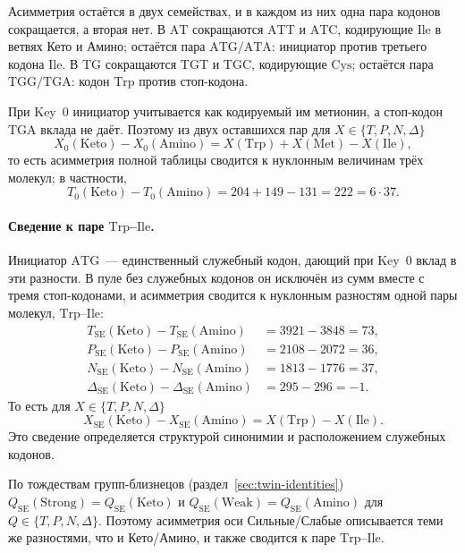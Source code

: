 \documentclass[11pt,a4paper]{article}
\renewcommand{\_}{\origunderscore\allowbreak}
\begin{document}
Асимметрия остаётся в двух семействах, и в каждом из них одна пара
кодонов сокращается, а вторая нет. В $\mathrm{AT}$ сокращаются
$\mathrm{ATT}$ и $\mathrm{ATC}$,
кодирующие $\mathrm{Ile}$ в ветвях Кето и Амино; остаётся пара
$\mathrm{ATG}/\mathrm{ATA}$: инициатор против третьего кодона
$\mathrm{Ile}$. В $\mathrm{TG}$ сокращаются $\mathrm{TGT}$ и
$\mathrm{TGC}$, кодирующие $\mathrm{Cys}$; остаётся пара
$\mathrm{TGG}/\mathrm{TGA}$: кодон $\mathrm{Trp}$ против
стоп-кодона.

При Key~0 инициатор учитывается как кодируемый им метионин, а
стоп-кодон $\mathrm{TGA}$ вклада не даёт. Поэтому из двух оставшихся
пар для $X\in\{T,P,N,\Delta\}$
\[
X_{0}(\mathrm{Keto})-X_{0}(\mathrm{Amino})
=
X(\mathrm{Trp})+X(\mathrm{Met})-X(\mathrm{Ile}),
\]
то есть асимметрия полной таблицы сводится к нуклонным величинам трёх
молекул; в частности,
\[
T_{0}(\mathrm{Keto}) - T_{0}(\mathrm{Amino})
  = 204 + 149 - 131 = 222 = 6 \cdot 37.
\]

\paragraph{Сведение к паре $\mathrm{Trp}$--$\mathrm{Ile}$.}
Инициатор $\mathrm{ATG}$~--- единственный служебный кодон, дающий при
Key~0 вклад в эти разности. В пуле без служебных кодонов он исключён
из сумм вместе с тремя стоп-кодонами, и асимметрия сводится
к нуклонным разностям одной пары молекул,
$\mathrm{Trp}$--$\mathrm{Ile}$:
\[
\begin{aligned}
T_{\mathrm{SE}}(\mathrm{Keto}) - T_{\mathrm{SE}}(\mathrm{Amino})
  &= 3921 - 3848 = 73, \\
P_{\mathrm{SE}}(\mathrm{Keto}) - P_{\mathrm{SE}}(\mathrm{Amino})
  &= 2108 - 2072 = 36, \\
N_{\mathrm{SE}}(\mathrm{Keto}) - N_{\mathrm{SE}}(\mathrm{Amino})
  &= 1813 - 1776 = 37, \\
\Delta_{\mathrm{SE}}(\mathrm{Keto})
  - \Delta_{\mathrm{SE}}(\mathrm{Amino})
  &= 295 - 296 = -1.
\end{aligned}
\]
То есть для $X\in\{T,P,N,\Delta\}$
\[
X_{\mathrm{SE}}(\mathrm{Keto})
-
X_{\mathrm{SE}}(\mathrm{Amino})
=
X(\mathrm{Trp})-X(\mathrm{Ile}).
\]
Это сведение определяется структурой синонимии и расположением
служебных кодонов.

По тождествам групп-близнецов (раздел~\ref{sec:twin-identities})
$Q_{\mathrm{SE}}(\mathrm{Strong}) = Q_{\mathrm{SE}}(\mathrm{Keto})$ и
$Q_{\mathrm{SE}}(\mathrm{Weak}) = Q_{\mathrm{SE}}(\mathrm{Amino})$ для
$Q\in\{T,P,N,\Delta\}$. Поэтому асимметрия оси Сильные/Слабые
описывается теми же разностями, что и Кето/Амино, и также сводится к
паре $\mathrm{Trp}$--$\mathrm{Ile}$.
\end{document}
